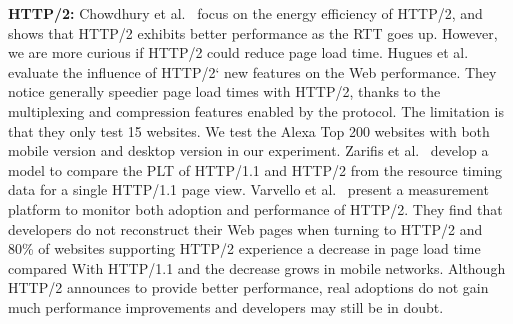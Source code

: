 \textbf{HTTP/2:} Chowdhury et al.~\cite{Chowdhury:PEERJ15} focus on the energy efficiency of HTTP/2, and shows that HTTP/2 exhibits better performance as the RTT goes up. However, we are more curious if HTTP/2 could reduce page load time. Hugues et al.~\cite{Saxce:INFCOM15} evaluate the influence of HTTP/2` new features on the Web performance. They notice generally speedier page load times with HTTP/2, thanks to the multiplexing and compression features enabled by the protocol. The limitation is that they only test 15 websites. We test the Alexa Top 200 websites with both mobile version and desktop version in our experiment. Zarifis et al.~\cite{Zarifis:PAM16} develop a model to compare the PLT of HTTP/1.1 and HTTP/2 from the resource timing data for a single HTTP/1.1 page view. Varvello et al.~\cite{Varvello:PAM16} present a measurement platform to monitor both adoption and performance of HTTP/2. They find that developers do not reconstruct their Web pages when turning to HTTP/2 and 80\% of websites supporting HTTP/2 experience a decrease in page load time compared With HTTP/1.1 and the decrease grows in mobile networks. Although HTTP/2 announces to provide better performance, real adoptions do not gain much performance improvements and developers may still be in doubt. 